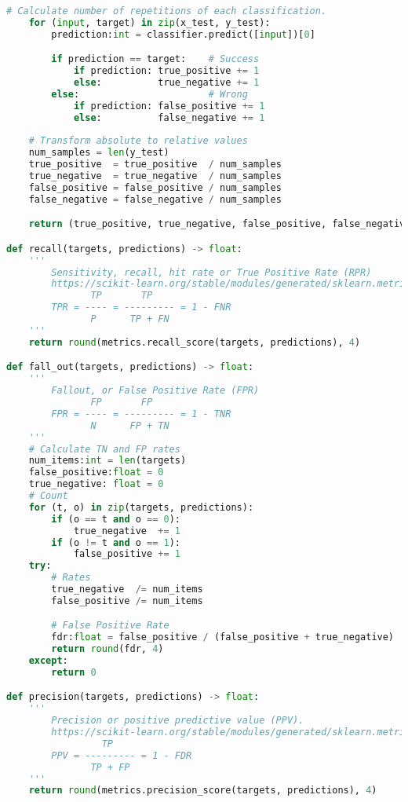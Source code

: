 \begin{lstlisting}[language=Python, caption={Load datasets, calculate metrics, 
export results to CSV files, etc.}, label={lst:data}]
    # Calculate number of repetitions of each classification. 
    for (input, target) in zip(x_test, y_test):
        prediction:int = classifier.predict([input])[0]

        if prediction == target:    # Success
            if prediction: true_positive += 1
            else:          true_negative += 1
        else:                       # Wrong
            if prediction: false_positive += 1
            else:          false_negative += 1
    
    # Transform absolute to relative values
    num_samples = len(y_test)
    true_positive  = true_positive  / num_samples
    true_negative  = true_negative  / num_samples
    false_positive = false_positive / num_samples
    false_negative = false_negative / num_samples

    return (true_positive, true_negative, false_positive, false_negative)

def recall(targets, predictions) -> float:
    '''
        Sensitivity, recall, hit rate or True Positive Rate (RPR)
        https://scikit-learn.org/stable/modules/generated/sklearn.metrics.recall_score.html
               TP       TP
        TPR = ---- = --------- = 1 - FNR
               P      TP + FN
    '''
    return round(metrics.recall_score(targets, predictions), 4)

def fall_out(targets, predictions) -> float:
    '''
        Fallout, or False Positive Rate (FPR)
               FP       FP
        FPR = ---- = --------- = 1 - TNR
               N      FP + TN
    '''
    # Calculate TN and FP rates
    num_items:int = len(targets)
    false_positive:float = 0
    true_negative: float = 0
    # Count
    for (t, o) in zip(targets, predictions):
        if (o == t and o == 0):
            true_negative  += 1
        if (o != t and o == 1):
            false_positive += 1
    try:
        # Rates
        true_negative  /= num_items
        false_positive /= num_items

        # False Positive Rate
        fdr:float = false_positive / (false_positive + true_negative)
        return round(fdr, 4)
    except:
        return 0

def precision(targets, predictions) -> float:
    '''
        Precision or positive predictive value (PPV).
        https://scikit-learn.org/stable/modules/generated/sklearn.metrics.precision_score.html
                 TP
        PPV = --------- = 1 - FDR
               TP + FP
    '''
    return round(metrics.precision_score(targets, predictions), 4)


\end{lstlisting}
